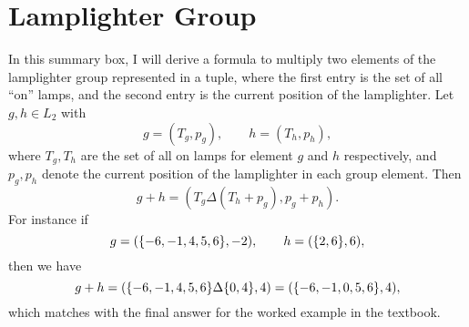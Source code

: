 \chapter{Lamplighter Group }


\begin{summary}
	In this summary box, I will derive a formula to multiply two elements of the lamplighter group represented in a tuple, where the first entry is the set of all ``on'' lamps, and the second entry is the current position of the lamplighter. Let $ g,h \in L_2 $ with
	\[ g = (T_g, p_g), \qquad h = (T_h, p_h), \]
	where $ T_g, T_h $ are the set of all on lamps for element $ g $ and $ h $ respectively, and $ p_g, p_h $ denote the current position of the lamplighter in each group element. Then 
	\[ g+h = (T_g \Delta (T_h+p_g), p_g+p_h). \]
	For instance if
	\[ g=(\{-6,-1,4,5,6\},-2), \qquad h = (\{2,6\}, 6), \]
	then we have
	\[ g+h = (\{-6,-1,4,5,6\}\Delta\{0,4\}, 4) = (\{-6,-1,0,5,6\},4), \]
	which matches with the final answer for the worked example in the textbook.
\end{summary}